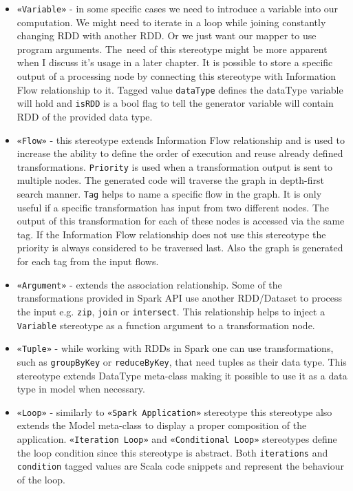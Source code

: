 \begin{itemize}
\item \texttt{«Variable»} - in some specific cases we need to introduce a variable into our computation. We might need to iterate in a loop while joining constantly changing RDD with another RDD. Or we just want our mapper to use program arguments. The~need of this stereotype might be more apparent when I discuss it's usage in a later chapter. It is possible to store a specific output of a processing node by connecting this stereotype with Information Flow relationship to it. Tagged value \texttt{dataType} defines the dataType variable will hold and \texttt{isRDD} is a bool flag to tell the generator variable will contain RDD of the provided data type.

\item \texttt{«Flow»} - this stereotype extends Information Flow relationship and is used to increase the ability to define the order of execution and reuse already defined transformations. \texttt{Priority} is used when a transformation output is sent to multiple nodes. The generated code will traverse the graph in depth-first search manner. \texttt{Tag} helps to name a specific flow in the graph. It is only useful if a specific transformation has input from two different nodes. The output of this transformation for each of these nodes is accessed via the same tag. If the Information Flow relationship does not use this stereotype the priority is always considered to be traversed last. Also the graph is generated for each tag from the input flows. 

\item \texttt{«Argument»} - extends the association relationship. Some of the transformations provided in Spark API use another RDD/Dataset to process the input e.g. \texttt{zip}, \texttt{join} or \texttt{intersect}. This relationship helps to inject a \texttt{Variable} stereotype as a function argument to a transformation node.

\item \texttt{«Tuple»} - while working with RDDs in Spark one can use transformations, such as \texttt{groupByKey} or \texttt{reduceByKey}, that need tuples as their data type. This stereotype extends DataType meta-class making it possible to use it as a data type in model when necessary. 

\item \texttt{«Loop»} - similarly to \texttt{«Spark Application»} stereotype this stereotype also extends the Model meta-class to display a proper composition of the application. \texttt{«Iteration Loop»} and \texttt{«Conditional Loop»} stereotypes define the loop condition since this stereotype is abstract. Both \texttt{iterations} and \texttt{condition} tagged values are Scala code snippets and represent the behaviour of the loop.

\end{itemize}


